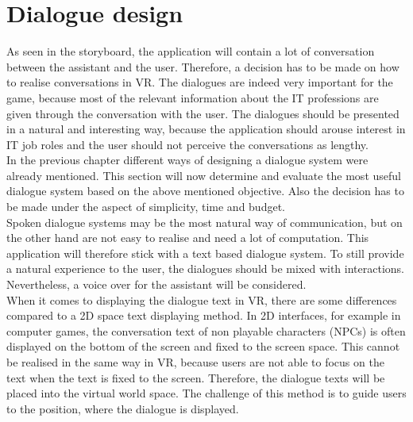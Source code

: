 \newpage
\section{Dialogue design}
As seen in the storyboard, the application will contain a lot of conversation between the assistant and the user. Therefore, a decision has to be made on how to realise conversations in VR. The dialogues are indeed very important for the game, because most of the relevant information about the IT professions are given through the conversation with the user. The dialogues should be presented in a natural and interesting way, because the application should arouse interest in IT job roles and the user should not perceive the conversations as lengthy.\\
In the previous chapter different ways of designing a dialogue system were already mentioned. This section will now determine and evaluate the most useful dialogue system based on the above mentioned objective. Also the decision has to be made under the aspect of simplicity, time and budget.\\
Spoken dialogue systems may be the most natural way of communication, but on the other hand are not easy to realise and need a lot of computation. This application will therefore stick with a text based dialogue system. To still provide a natural experience to the user, the dialogues should be mixed with interactions. Nevertheless, a voice over for the assistant will be considered. \\
When it comes to displaying the dialogue text in VR, there are some differences compared to a 2D space text displaying method. In 2D interfaces, for example in computer games, the conversation text of non playable characters (NPCs) is often displayed on the bottom of the screen and fixed to the screen space. This cannot be realised in the same way in VR, because users are not able to focus on the text when the text is fixed to the screen. Therefore, the dialogue texts will be placed into the virtual world space. The challenge of this method is to guide users to the position, where the dialogue is displayed.
